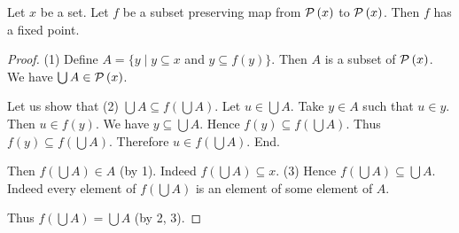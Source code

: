 \documentclass[../../set-theory/set-theory.tex]{subfiles}
\begin{document}
  \begin{forthel}
    \begin{theorem}
      Let $x$ be a set.
      Let $f$ be a subset preserving map from $\mathcal{P}\left(x\right)$ to $\mathcal{P}\left(x\right)$.
      Then $f$ has a fixed point.
    \end{theorem}
    \begin{proof}
      (1) Define $A = \{ y \mid y \subseteq x$ and $y \subseteq f(y) \}$.
      Then $A$ is a subset of $\mathcal{P}\left(x\right)$.
      We have $\bigcup A \in \mathcal{P}\left(x\right)$.

      Let us show that (2) $\bigcup A \subseteq f(\bigcup A)$.
        Let $u \in \bigcup A$.
        Take $y \in A$ such that $u \in y$.
        Then $u \in f(y)$.
        We have $y \subseteq \bigcup A$.
        Hence $f(y) \subseteq f(\bigcup A)$.
        Thus $f(y) \subseteq f(\bigcup A)$.
        Therefore $u \in f(\bigcup A)$.
      End.

      Then $f(\bigcup A) \in A$ (by 1).
      Indeed $f(\bigcup A) \subseteq x$.
      (3) Hence $f(\bigcup A) \subseteq \bigcup A$.
      Indeed every element of $f(\bigcup A)$ is an element of some element of
      $A$.

      Thus $f(\bigcup A) = \bigcup A$ (by 2, 3).
    \end{proof}
  \end{forthel}
\end{document}
